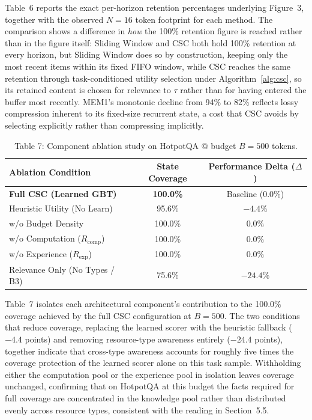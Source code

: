 \documentclass{article}
\begin{document}
Table~6 reports the exact per-horizon retention percentages underlying Figure~3, together with the observed $N=16$ token footprint for each method. The comparison shows a difference in \emph{how} the 100\% retention figure is reached rather than in the figure itself: Sliding Window and CSC both hold 100\% retention at every horizon, but Sliding Window does so by construction, keeping only the most recent items within its fixed FIFO window, while CSC reaches the same retention through task-conditioned utility selection under Algorithm~\ref{alg:csc}, so its retained content is chosen for relevance to $\tau$ rather than for having entered the buffer most recently. MEM1's monotonic decline from 94\% to 82\% reflects lossy compression inherent to its fixed-size recurrent state, a cost that CSC avoids by selecting explicitly rather than compressing implicitly.

\begin{table}[h]
\caption{Table 7: Component ablation study on HotpotQA @ budget $B=500$ tokens.}
\centering
\begin{tabular}{lcc}
\toprule
Ablation Condition & State Coverage & Performance Delta ($\Delta$) \\
\midrule
\textbf{Full CSC (Learned GBT)} & \textbf{100.0\%} & Baseline ($0.0\%$) \\
Heuristic Utility (No Learn) & 95.6\% & $-4.4\%$ \\
w/o Budget Density & 100.0\% & $0.0\%$ \\
w/o Computation ($R_{\text{comp}}$) & 100.0\% & $0.0\%$ \\
w/o Experience ($R_{\text{exp}}$) & 100.0\% & $0.0\%$ \\
Relevance Only (No Types / B3) & 75.6\% & $\mathbf{-24.4\%}$ \\
\bottomrule
\end{tabular}
\end{table}

Table~7 isolates each architectural component's contribution to the 100.0\% coverage achieved by the full CSC configuration at $B=500$. The two conditions that reduce coverage, replacing the learned scorer with the heuristic fallback ($-4.4$ points) and removing resource-type awareness entirely ($-24.4$ points), together indicate that cross-type awareness accounts for roughly five times the coverage protection of the learned scorer alone on this task sample. Withholding either the computation pool or the experience pool in isolation leaves coverage unchanged, confirming that on HotpotQA at this budget the facts required for full coverage are concentrated in the knowledge pool rather than distributed evenly across resource types, consistent with the reading in Section~5.5.
\end{document}
